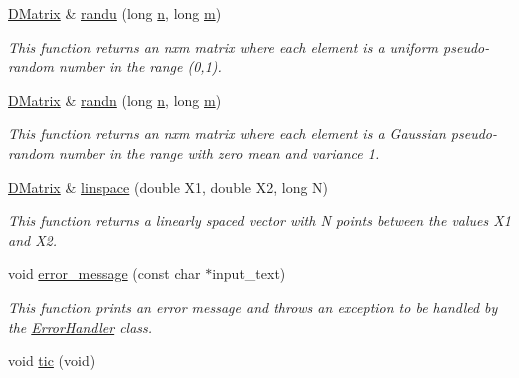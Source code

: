 \begin{DoxyCompactItemize}
\hyperlink{classDMatrix}{DMatrix} \& \hyperlink{classDMatrix_a299e165ca173181d5efb78a2098f742c}{randu} (long \hyperlink{classDMatrix_a6b7668991ff7d01230b3599836a5d682}{n}, long \hyperlink{classDMatrix_a9cb55e3ad06f81025fed1ffbb0ae28bd}{m})
\begin{DoxyCompactList}\small\item\em This function returns an nxm matrix where each element is a uniform pseudo-\/random number in the range (0,1). \item\end{DoxyCompactList}\item 
\hyperlink{classDMatrix}{DMatrix} \& \hyperlink{classDMatrix_a4bc7a80762269f95de50605fc87f0223}{randn} (long \hyperlink{classDMatrix_a6b7668991ff7d01230b3599836a5d682}{n}, long \hyperlink{classDMatrix_a9cb55e3ad06f81025fed1ffbb0ae28bd}{m})
\begin{DoxyCompactList}\small\item\em This function returns an nxm matrix where each element is a Gaussian pseudo-\/random number in the range with zero mean and variance 1. \item\end{DoxyCompactList}\item 
\hyperlink{classDMatrix}{DMatrix} \& \hyperlink{classDMatrix_aa3d52614c6e5b34caff46a462af5e48c}{linspace} (double X1, double X2, long N)
\begin{DoxyCompactList}\small\item\em This function returns a linearly spaced vector with N points between the values X1 and X2. \item\end{DoxyCompactList}\item 
void \hyperlink{classDMatrix_a6067456d71764a846f24a141e77d00f3}{error\_\-message} (const char $\ast$input\_\-text)
\begin{DoxyCompactList}\small\item\em This function prints an error message and throws an exception to be handled by the \hyperlink{classErrorHandler}{ErrorHandler} class. \item\end{DoxyCompactList}\item 
\hypertarget{classDMatrix_ace51fd7d8435f88c8b2b3bcf64367673}{
void \hyperlink{classDMatrix_ace51fd7d8435f88c8b2b3bcf64367673}{tic} (void)}
\label{classDMatrix_ace51fd7d8435f88c8b2b3bcf64367673}


\end{DoxyCompactItemize}
